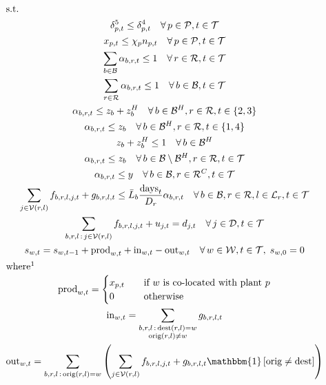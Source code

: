 \documentclass[10pt]{article}
\begin{document}
\begin{gather}
    \shortintertext{s.t.}
    \delta^5_{p, t} \le \delta^4_{p, t}\quad\forall\, p\in \mathcal{P}, t\in \mathcal{T}\\
    x_{p, t}\le \chi_p n_{p, t} \quad\forall\, p \in \mathcal{P}, t \in \mathcal{T}\\
    \sum_{b\in \mathcal{B}}\alpha_{b, r, t}\le 1\quad\forall\, r\in \mathcal{R}, t\in \mathcal{T}\\
    \sum_{r\in \mathcal{R}}\alpha_{b, r, t}\le 1\quad\forall\, b\in \mathcal{B}, t\in \mathcal{T}\\
    \alpha_{b,r,t} \leq z_b + z_b^H \quad\forall\, b \in \mathcal{B}^H, r \in \mathcal{R}, t \in \{2,3\}\\
    \alpha_{b,r,t} \leq z_b \quad \forall\, b \in \mathcal{B}^H, r \in \mathcal{R}, t \in \{1,4\}\\
    z_b + z_b^H \leq 1 \quad \forall\, b \in \mathcal{B}^H\\
    \alpha_{b,r,t} \leq z_b \quad \forall\, b \in \mathcal{B} \setminus \mathcal{B}^H, r \in \mathcal{R}, t \in \mathcal{T}\\
    \alpha_{b, r, t} \le y \quad\forall\, b\in \mathcal{B}, r\in \mathcal{R}^C, t\in \mathcal{T}\\
    \sum_{j\in \mathcal{V}(r, l)}f_{b, r, l, j, t} + g_{b, r, l, t}\le \bar{L}_b\frac{\text{days}_t}{D_r}\alpha_{b, r, t}\quad\forall\, b \in \mathcal{B}, r \in \mathcal{R}, l \in \mathcal{L}_r, t \in \mathcal{T}\\
    \sum_{\substack{b, r, l \,:\, j \in \mathcal{V}(r,l)}} f_{b,r,l,j,t} + u_{j,t} = d_{j,t}\quad\forall\, j\in \mathcal{D}, t\in \mathcal{T}\\
    s_{w, t} = s_{w, t - 1} + \text{prod}_{w, t} + \text{in}_{w, t} - \text{out}_{w, t}\quad\forall\, w \in \mathcal{W}, t \in \mathcal{T},\; s_{w,0} = 0\\
    \shortintertext{where\footnotemark}
    \text{prod}_{w, t} = 
    \begin{cases}
        x_{p,t} & \quad\text{if $w$ is co-located with plant $p$}\\
        0 & \quad\text{otherwise}
    \end{cases}\\
    \text{in}_{w, t} = \sum_{\substack{b, r, l \,:\, \text{dest}(r, l) = w\\\text{orig}(r, l) \neq w}} g_{b, r, l, t}\\
    \text{out}_{w, t} = \sum_{b, r, l \,:\, \text{orig}(r, l) = w}\left( \sum_{j\in \mathcal{V}(r, l)} f_{b, r, l, j, t} + g_{b, r, l, t} \mathbbm{1}\left[\text{orig}\neq\text{dest}\right] \right)\\

\end{gather}
\end{document}
